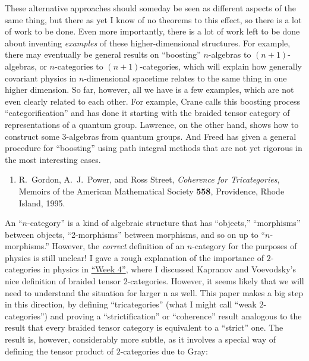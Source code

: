\documentclass{article}
\def\tightlist{}
\begin{document}
These alternative approaches should someday be seen as different aspects
of the same thing, but there as yet I know of no theorems to this
effect, so there is a lot of work to be done. Even more importantly,
there is a lot of work left to be done about inventing \emph{examples}
of these higher-dimensional structures. For example, there may
eventually be general results on ``boosting'' \(n\)-algebras to
\((n+1)\)-algebras, or \(n\)-categories to \((n+1)\)-categories, which
will explain how generally covariant physics in \(n\)-dimensional
spacetime relates to the same thing in one higher dimension. So far,
however, all we have is a few examples, which are not even clearly
related to each other. For example, Crane calls this boosting process
``categorification'' and has done it starting with the braided tensor
category of representations of a quantum group. Lawrence, on the other
hand, shows how to construct some 3-algebras from quantum groups. And
Freed has given a general procedure for ``boosting'' using path integral
methods that are not yet rigorous in the most interesting cases.

\begin{enumerate}
\def\labelenumi{\arabic{enumi})}
\setcounter{enumi}{1}
\tightlist
\item
   R.\ Gordon, A.\ J.\ Power, and Ross
  Street, \emph{Coherence for Tricategories}, Memoirs of the American
  Mathematical Society \textbf{558}, Providence, Rhode Island, 1995.
\end{enumerate}

An ``\(n\)-category'' is a kind of algebraic structure that has
``objects,'' ``morphisms'' between objects, ``2-morphisms'' between
morphisms, and so on up to ``\(n\)-morphisms.'' However, the
\emph{correct} definition of an \(n\)-category for the purposes of
physics is still unclear! I gave a rough explanation of the importance
of \(2\)-categories in physics in \protect\hyperlink{week4}{``Week 4''},
where I discussed Kapranov and Voevodsky's nice definition of braided
tensor \(2\)-categories. However, it seems likely that we will need to
understand the situation for larger n as well. This paper makes a big
step in this direction, by defining ``tricategories'' (what I might call
``weak \(2\)-categories'') and proving a ``strictification'' or
``coherence'' result analogous to the result that every braided tensor
category is equivalent to a ``strict'' one. The result is, however,
considerably more subtle, as it involves a special way of defining the
tensor product of \(2\)-categories due to Gray:
\end{document}

